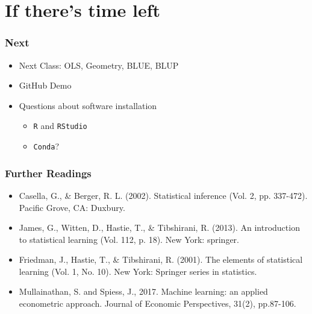 \documentclass[
  shownotes,
  xcolor={svgnames},
  hyperref={colorlinks,citecolor=DarkBlue,linkcolor=DarkRed,urlcolor=DarkBlue}
  ]{beamer}
\begin{document}

\section{If there's time left}

\begin{frame}
\frametitle{Next}
  
  \begin{itemize} 
  \item  Next Class: OLS, Geometry, BLUE, BLUP
  \bigskip
  \item  GitHub Demo
  \bigskip
  \item Questions about software installation
  \medskip
    \begin{itemize} 
      \item  \texttt{R} and \texttt{RStudio}
      \medskip
      \item \texttt{Conda}? 
    \end{itemize}
  \end{itemize}


\end{frame}


\begin{frame}
\frametitle{Further Readings}

\begin{itemize}
  \item Casella, G., \& Berger, R. L. (2002). Statistical inference (Vol. 2, pp. 337-472). Pacific Grove, CA: Duxbury.
  \bigskip
  \item James, G., Witten, D., Hastie, T., \& Tibshirani, R. (2013). An introduction to statistical learning (Vol. 112, p. 18). New York: springer.
  \bigskip
  \item Friedman, J., Hastie, T., \& Tibshirani, R. (2001). The elements of statistical learning (Vol. 1, No. 10). New York: Springer series in statistics.
  \bigskip
  \item Mullainathan, S. and Spiess, J., 2017. Machine learning: an applied econometric approach. Journal of Economic Perspectives, 31(2), pp.87-106.
  

\end{itemize}

\end{frame}

\end{document}
